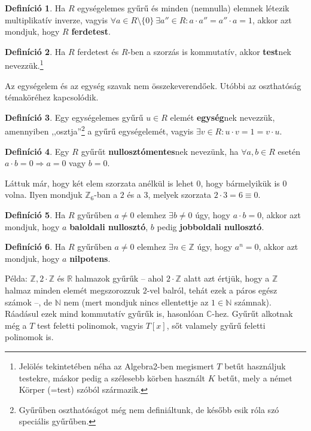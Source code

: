 \documentclass[12pt]{book}
\theoremstyle{plain} %
\theoremstyle{definition} %
\newtheorem{defi/}{Definíció}[section]
\newenvironment{defi}
  {\renewcommand{\qedsymbol}{$\clubsuit$}%
   \pushQED{\qed}\begin{defi/}}
  {\popQED\end{defi/}}
\theoremstyle{remark}
\renewcommand\qedsymbol{$\blacksquare$}
\numberwithin{equation}{section}  %
\begin{document}
	\begin{defi}
		Ha $R$ egységelemes gyűrű és minden (nemnulla) elemnek létezik multiplikatív inverze, vagyis $\forall a\in R\setminus\{0\}\ \exists a''\in R\colon a \cdot a'' = a'' \cdot a = 1$, akkor azt mondjuk, hogy $R$ \textbf{ferdetest}.
	\end{defi}
	\begin{defi}
		Ha $R$ ferdetest és $R$-ben a szorzás is kommutatív, akkor \textbf{test}nek nevezzük.\footnote{Jelölés tekintetében néha az Algebra2-ben megismert $T$ betűt használjuk testekre, máskor pedig a szélesebb körben használt $K$ betűt, mely a német Körper (=test) szóból származik.}
	\end{defi}
	Az egységelem és az egység szavak nem összekeverendőek. Utóbbi az oszthatóság témaköréhez kapcsolódik. 
	\begin{defi}
		Egy egységelemes gyűrű $u\in R$ elemét \textbf{egység}nek nevezzük, amennyiben ,,osztja''\footnote{Gyűrűben oszthatóságot még nem definiáltunk, de később esik róla szó speciális gyűrűben.} a gyűrű egységelemét, vagyis $\exists v\in R\colon u\cdot v= 1 = v\cdot u$.
	\end{defi}
	\begin{defi}
		Egy $R$ gyűrűt \textbf{nullosztómentes}nek nevezünk, ha $\forall a,b\in R$ esetén $a\cdot b=0 \Rightarrow a=0$ vagy $b=0$.
	\end{defi}
	Láttuk már, hogy két elem szorzata anélkül is lehet $0$, hogy bármelyikük is $0$ volna. Ilyen mondjuk $\mathbb{Z}_6$-ban a $2$ és a $3$, melyek szorzata $2\cdot 3=6\equiv 0$.
	\begin{defi}
		Ha $R$ gyűrűben $a\neq 0$ elemhez $\exists b\neq 0$ úgy, hogy $a\cdot b=0$, akkor azt mondjuk, hogy $a$ \textbf{baloldali nullosztó}, $b$ pedig \textbf{jobboldali nullosztó}.
	\end{defi}
	\begin{defi}
		Ha $R$ gyűrűben $a\neq 0$ elemhez $\exists n\in \mathbb{Z}$ úgy, hogy $a^n=0$, akkor azt mondjuk, hogy $a$ \textbf{nilpotens}.
	\end{defi}
	Példa: $\mathbb{Z}, 2\cdot \mathbb{Z}$ és $\mathbb{R}$ halmazok gyűrűk -- ahol $2\cdot \mathbb{Z}$ alatt azt értjük, hogy a $\mathbb{Z}$ halmaz minden elemét megszorozzuk $2$-vel balról, tehát ezek a páros egész számok --, de $\mathbb{N}$ nem (mert mondjuk nincs ellentettje az $1\in \mathbb{N}$ számnak). Ráadásul ezek mind kommutatív gyűrűk is, hasonlóan $\mathbb{C}$-hez. Gyűrűt alkotnak még a $T$ test feletti polinomok, vagyis $T[x]$, sőt valamely gyűrű feletti polinomok is.
	
\end{document}
